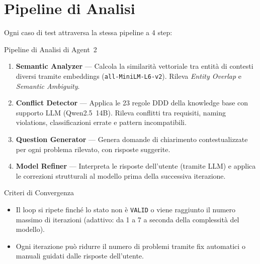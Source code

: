 \documentclass[12pt,a4paper]{report}
\begin{document}
\section{Pipeline di Analisi}

Ogni caso di test attraversa la stessa pipeline a 4 step:

\begin{technicalbox}{Pipeline di Analisi di Agent~2}
\begin{enumerate}
  \item \textbf{Semantic Analyzer} --- Calcola la similarità vettoriale tra entità di
        contesti diversi tramite embeddings (\texttt{all-MiniLM-L6-v2}).
        Rileva \textit{Entity Overlap} e \textit{Semantic Ambiguity}.

  \item \textbf{Conflict Detector} --- Applica le 23 regole DDD della knowledge base
        con supporto LLM (Qwen2.5~14B). Rileva conflitti tra requisiti, naming violations,
        classificazioni errate e pattern incompatibili.

  \item \textbf{Question Generator} --- Genera domande di chiarimento contestualizzate
        per ogni problema rilevato, con risposte suggerite.

  \item \textbf{Model Refiner} --- Interpreta le risposte dell'utente (tramite LLM)
        e applica le correzioni strutturali al modello prima della successiva iterazione.
\end{enumerate}
\end{technicalbox}

\vspace{1em}

\begin{technicalbox}{Criteri di Convergenza}
\begin{itemize}
  \item Il loop si ripete finché lo stato non è \texttt{VALID} o viene raggiunto il numero
        massimo di iterazioni (adattivo: da 1 a 7 a seconda della complessità del modello).
  \item Ogni iterazione può ridurre il numero di problemi tramite fix automatici o
        manuali guidati dalle risposte dell'utente.
\end{itemize}
\end{technicalbox}


\clearpage

\end{document}
